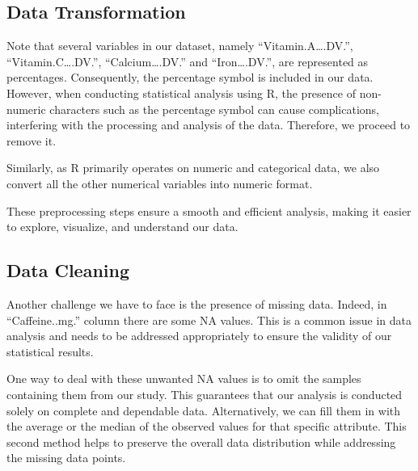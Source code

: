 \documentclass[
]{article}
\newenvironment{Shaded}{\begin{snugshade}}{\end{snugshade}}
\newcommand{\CommentTok}[1]{\textcolor[rgb]{0.56,0.35,0.01}{\textit{#1}}}
\newcommand{\FunctionTok}[1]{\textcolor[rgb]{0.13,0.29,0.53}{\textbf{#1}}}
\newcommand{\NormalTok}[1]{#1}
\newcommand{\OtherTok}[1]{\textcolor[rgb]{0.56,0.35,0.01}{#1}}
\newcommand{\SpecialCharTok}[1]{\textcolor[rgb]{0.81,0.36,0.00}{\textbf{#1}}}
\newcommand{\StringTok}[1]{\textcolor[rgb]{0.31,0.60,0.02}{#1}}
\begin{document}
\subsection{Data Transformation}\label{data-transformation}

Note that several variables in our dataset, namely
``Vitamin.A\ldots.DV.'', ``Vitamin.C\ldots.DV.'', ``Calcium\ldots.DV.''
and ``Iron\ldots.DV.'', are represented as percentages. Consequently,
the percentage symbol is included in our data. However, when conducting
statistical analysis using R, the presence of non-numeric characters
such as the percentage symbol can cause complications, interfering with
the processing and analysis of the data. Therefore, we proceed to remove
it.

Similarly, as R primarily operates on numeric and categorical data, we
also convert all the other numerical variables into numeric format.

These preprocessing steps ensure a smooth and efficient analysis, making
it easier to explore, visualize, and understand our data.

\begin{Shaded}
\end{Shaded}

\subsection{Data Cleaning}\label{data-cleaning}

Another challenge we have to face is the presence of missing data.
Indeed, in ``Caffeine..mg.'' column there are some NA values. This is a
common issue in data analysis and needs to be addressed appropriately to
ensure the validity of our statistical results.

One way to deal with these unwanted NA values is to omit the samples
containing them from our study. This guarantees that our analysis is
conducted solely on complete and dependable data. Alternatively, we can
fill them in with the average or the median of the observed values for
that specific attribute. This second method helps to preserve the
overall data distribution while addressing the missing data points.
\end{document}
